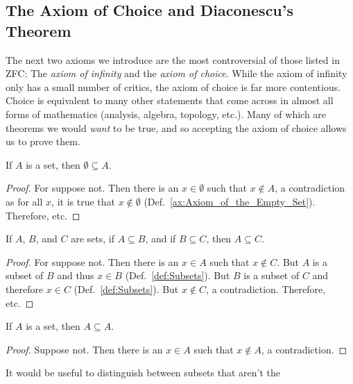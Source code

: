     \subsection{The Axiom of Choice and Diaconescu's Theorem}
        The next two axioms we introduce are the most controversial of those
        listed in ZFC: The \textit{axiom of infinity} and the
        \textit{axiom of choice}. While the axiom of infinity only has a
        small number of critics, the axiom of choice is far more contentious.
        Choice is equivalent to many other statements that come across in
        almost all forms of mathematics (analysis, algebra, topology, etc.).
        Many of which are theorems we would \textit{want} to be true, and so
        accepting the axiom of choice allows us to prove them.
        \begin{theorem}
            \label{thm:Emptyset_Is_Subset}%
            If $A$ is a set, then $\emptyset\subseteq{A}$.
        \end{theorem}
        \begin{proof}
            For suppose not. Then there is an $x\in\emptyset$ such that
            $x\notin{A}$, a contradiction as for all $x$, it is true that
            $x\notin\emptyset$ (Def.~\ref{ax:Axiom_of_the_Empty_Set}).
            Therefore, etc.
        \end{proof}
        \begin{theorem}
            \label{thm:Subset_is_Transitive}%
            If $A$, $B$, and $C$ are sets, if $A\subseteq{B}$, and if
            $B\subseteq{C}$, then $A\subseteq{C}$.
        \end{theorem}
        \begin{proof}
            For suppose not. Then there is an $x\in{A}$ such that
            $x\notin{C}$. But $A$ is a subset of $B$ and thus $x\in{B}$
            (Def.~\ref{def:Subsets}). But $B$ is a subset of $C$ and
            therefore $x\in{C}$ (Def.~\ref{def:Subsets}). But $x\notin{C}$,
            a contradiction. Therefore, etc.
        \end{proof}
        \begin{theorem}
            \label{thm:Set_Is_Subset_Of_Self}%
            If $A$ is a set, then $A\subseteq{A}$.
        \end{theorem}
        \begin{proof}
            Suppose not. Then there is an $x\in{A}$
            such that $x\notin{A}$, a contradiction.
        \end{proof}
        It would be useful to distinguish between subsets that aren't the
